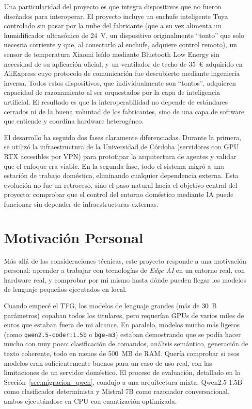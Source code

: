 Una particularidad del proyecto es que integra dispositivos que no fueron diseñados para interoperar. El proyecto incluye un enchufe inteligente Tuya controlado sin pasar por la nube del fabricante (que a su vez alimenta un humidificador ultrasónico de 24~V, un dispositivo originalmente ``tonto'' que solo necesita corriente y que, al conectarlo al enchufe, adquiere control remoto), un sensor de temperatura Xiaomi leído mediante Bluetooth Low Energy sin necesidad de su aplicación oficial, y un ventilador de techo de 35~\euro{} adquirido en AliExpress cuyo protocolo de comunicación fue descubierto mediante ingeniería inversa. Todos estos dispositivos, que individualmente son ``tontos'', adquieren capacidad de razonamiento al ser orquestados por la capa de inteligencia artificial. El resultado es que la interoperabilidad no depende de estándares cerrados ni de la buena voluntad de los fabricantes, sino de una capa de software que entiende y coordina hardware heterogéneo.

El desarrollo ha seguido dos fases claramente diferenciadas. Durante la primera, se utilizó la infraestructura de la Universidad de Córdoba (servidores con GPU RTX accesibles por VPN) para prototipar la arquitectura de agentes y validar que el enfoque era viable. En la segunda fase, todo el sistema migró a una estación de trabajo doméstica, eliminando cualquier dependencia externa. Esta evolución no fue un retroceso, sino el paso natural hacia el objetivo central del proyecto: comprobar que el control del entorno doméstico mediante IA puede funcionar sin depender de infraestructuras externas.

\section{Motivación Personal}

Más allá de las consideraciones técnicas, este proyecto responde a una motivación personal: aprender a trabajar con tecnologías de \textit{Edge AI} en un entorno real, con hardware real, y comprobar por mí mismo hasta dónde pueden llegar los modelos de lenguaje pequeños ejecutados en local.

Cuando empecé el TFG, los modelos de lenguaje grandes (más de 30~B parámetros) copaban todos los titulares, pero requerían GPUs de varios miles de euros que estaban fuera de mi alcance. En paralelo, modelos mucho más ligeros (como \texttt{qwen2.5-coder:1.5b} o \texttt{bge-m3}) estaban demostrando que se podía hacer mucho con muy poco: clasificación de comandos, análisis semántico, generación de texto coherente, todo en menos de 500~MB de RAM. Quería comprobar si esos modelos eran suficientemente buenos para un caso de uso real, con las limitaciones de un servidor doméstico. El proceso de evaluación, detallado en la Sección~\ref{sec:migracion_qwen}, condujo a una arquitectura mixta: Qwen2.5 1.5B como clasificador determinista y Mistral 7B como razonador conversacional, ambos ejecutándose en CPU con cuantización optimizada.

